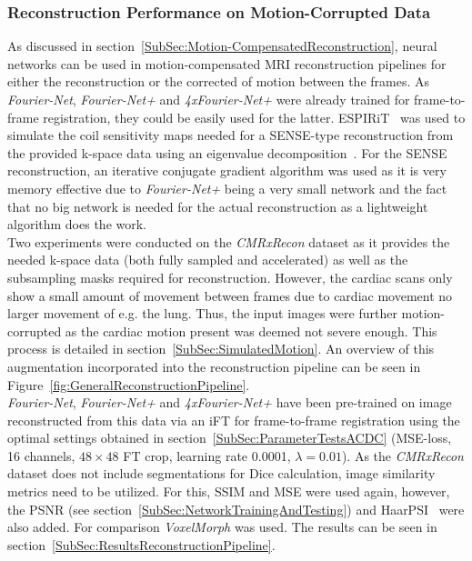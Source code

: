 \subsubsection{Reconstruction Performance on Motion-Corrupted Data} \label{SubSubSec:ReconstructionPipeline}
As discussed in section~\ref{SubSec:Motion-CompensatedReconstruction}, neural networks can be used in motion-compensated MRI reconstruction pipelines for either the reconstruction or the corrected of motion between the frames. As \emph{Fourier-Net}, \emph{Fourier-Net+} and \emph{4xFourier-Net+} were already trained for frame-to-frame registration, they could be easily used for the latter. ESPIRiT~\cite{ESPIRiT} was used to simulate the coil sensitivity maps needed for a SENSE-type reconstruction from the provided k-space data using an eigenvalue decomposition~\cite{ESPIRiT}. For the SENSE~\cite{SENSE1} reconstruction, an iterative conjugate gradient algorithm was used as it is very memory effective due to \emph{Fourier-Net+} being a very small network and the fact that no big network is needed for the actual reconstruction as a lightweight algorithm does the work. \\ 
Two experiments were conducted on the \emph{CMRxRecon} dataset as it provides the needed k-space data (both fully sampled and accelerated) as well as the subsampling masks required for reconstruction. However, the cardiac scans only show a small amount of movement between frames due to cardiac movement no larger movement of e.g. the lung. Thus, the input images were further motion-corrupted as the cardiac motion present was deemed not severe enough. This process is detailed in section~\ref{SubSec:SimulatedMotion}. An overview of this augmentation incorporated into the reconstruction pipeline can be seen in Figure~\ref{fig:GeneralReconstructionPipeline}.\\
\emph{Fourier-Net}, \emph{Fourier-Net+} and \emph{4xFourier-Net+} have been pre-trained on image reconstructed from this data via an iFT for frame-to-frame registration using the optimal settings obtained in section~\ref{SubSec:ParameterTestsACDC} (MSE-loss, 16 channels, $48 \times 48$ FT crop, learning rate 0.0001, $\lambda=0.01$). As the \emph{CMRxRecon} dataset does not include segmentations for Dice calculation, image similarity metrics need to be utilized. For this, SSIM and MSE were used again, however, the PSNR (see section~\ref{SubSec:NetworkTrainingAndTesting}) and HaarPSI~\cite{HaarPSI} were also added. For comparison \emph{VoxelMorph} was used. The results can be seen in section~\ref{SubSec:ResultsReconstructionPipeline}.



